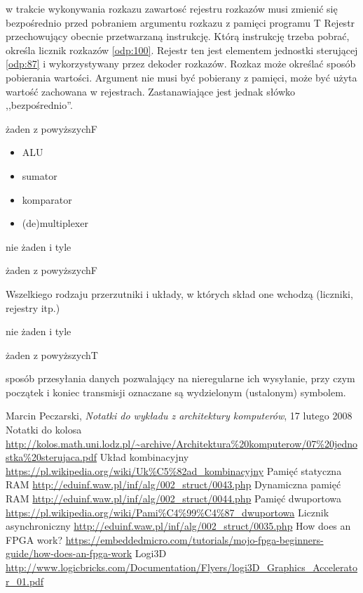 {w trakcie wykonywania rozkazu zawartosć rejestru rozkazów musi zmienić się bezpośrednio przed pobraniem argumentu rozkazu z pamięci programu
}{T}
{
	Rejestr przechowujący obecnie przetwarzaną instrukcję. Którą instrukcję trzeba pobrać, określa licznik rozkazów \ref{odp:100}. Rejestr ten jest elementem jednostki sterującej \ref{odp:87} i wykorzystywany przez dekoder rozkazów.
}
{Rozkaz może określać sposób pobierania wartości. Argument nie musi być pobierany z pamięci, może być użyta wartość zachowana w rejestrach. Zastanawiające jest jednak słówko ,,bezpośrednio''.}

{żaden z powyższych}{F}
{
	\begin{itemize}
		\item ALU
		\item sumator
		\item komparator
		\item (de)multiplexer
	\end{itemize}
	
}{nie żaden i tyle}

{żaden z powyższych}{F}
{
Wszelkiego rodzaju przerzutniki i układy, w których skład one wchodzą (liczniki, rejestry itp.)
	
}{nie żaden i tyle}

{żaden z powyższych}{T}
{
	sposób przesyłania danych pozwalający na nieregularne ich wysyłanie, przy czym początek i koniec transmisji oznaczane są wydzielonym (ustalonym) symbolem.
	
}
{}

\begin{thebibliography}{99}
 Marcin Peczarski, \emph{Notatki do wykładu z architektury komputerów}, 17 lutego 2008
 Notatki do kolosa \url{http://kolos.math.uni.lodz.pl/~archive/Architektura%20komputerow/07%20jednostka%20sterujaca.pdf}
 Układ kombinacyjny \url{https://pl.wikipedia.org/wiki/Uk%C5%82ad_kombinacyjny}
 Pamięć statyczna RAM \url{http://eduinf.waw.pl/inf/alg/002_struct/0043.php}
 Dynamiczna pamięć RAM \url{http://eduinf.waw.pl/inf/alg/002_struct/0044.php}
 Pamięć dwuportowa \url{https://pl.wikipedia.org/wiki/Pami%C4%99%C4%87_dwuportowa}
 Licznik asynchroniczny \url{http://eduinf.waw.pl/inf/alg/002_struct/0035.php}
 How does an FPGA work? \url{https://embeddedmicro.com/tutorials/mojo-fpga-beginners-guide/how-does-an-fpga-work}
 Logi3D \url{http://www.logicbricks.com/Documentation/Flyers/logi3D_Graphics_Accelerator_01.pdf}
\end{thebibliography}

